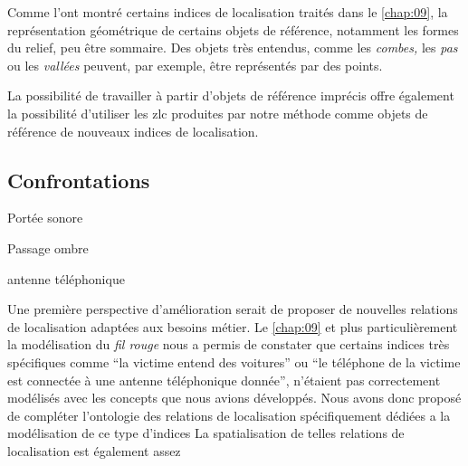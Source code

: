 Comme l'ont montré certains indices de localisation traités dans le
\autoref{chap:09}, la représentation géométrique de certains objets de
référence, notamment les formes du relief, peu être sommaire. Des
objets très entendus, comme les \emph{combes,} les \emph{pas} ou les
\emph{vallées} peuvent, par exemple, être représentés par des points.


La possibilité de travailler à partir d'objets de référence imprécis
offre également la possibilité d'utiliser les \ac{zlc} produites par
notre méthode comme objets de référence de nouveaux indices de
localisation.


\subsection*{Confrontations}




Portée sonore

Passage ombre

antenne téléphonique

Une première perspective d'amélioration serait de proposer de
nouvelles relations de localisation adaptées aux besoins métier. Le
\autoref{chap:09} et plus particulièrement la modélisation du
\emph{fil rouge} nous a permis de constater que certains indices très
spécifiques comme \enquote{la victime entend des voitures} ou
\enquote{le téléphone de la victime est connectée à une antenne
  téléphonique donnée}, n'étaient pas correctement modélisés avec les
concepts que nous avions développés.
%
Nous avons donc proposé de compléter l'ontologie des relations de
localisation spécifiquement dédiées a la modélisation de ce type
d'indices
%
La spatialisation de telles relations de localisation est également
assez 



